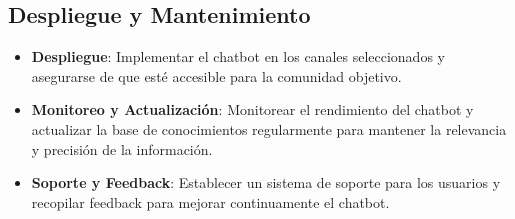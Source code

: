 \subsection{Despliegue y Mantenimiento}

\begin{itemize}
    \item \textbf{Despliegue}: Implementar el chatbot en los canales seleccionados y asegurarse de que esté accesible para la comunidad objetivo.
    \item \textbf{Monitoreo y Actualización}: Monitorear el rendimiento del chatbot y actualizar la base de conocimientos regularmente para mantener la relevancia y precisión de la información.
    \item \textbf{Soporte y Feedback}: Establecer un sistema de soporte para los usuarios y recopilar feedback para mejorar continuamente el chatbot.
\end{itemize}
